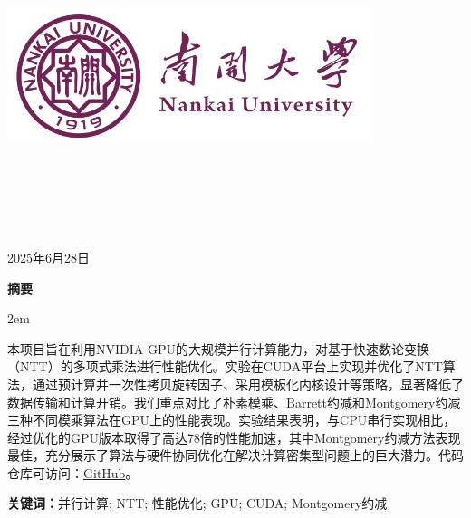 \documentclass[a4paper]{article}
\newcommand{\HRule}{\rule{\linewidth}{0.5mm}}%
\newenvironment{cnabstract}{
    \par\small
    \noindent\mbox{}\par\vspace{-\baselineskip}
    \par\songti\parindent 2em
    }
    {\par\vspace{1em}}
\begin{document}
\renewcommand{\contentsname}{目\ 录}
\renewcommand{\appendixname}{附录}
\renewcommand{\appendixpagename}{附录}
\renewcommand{\refname}{参考文献} 
\renewcommand{\figurename}{图}
\renewcommand{\tablename}{表}

\begin{titlepage}
    \begin{center}
    \includegraphics[width=0.8\textwidth]{fig/NKU.png}\\[1cm]
    \vspace{20mm}
		\textbf{\huge\textbf{}}\\[0.5cm]
		\textbf{\huge{}}\\[2.3cm]
		\textbf{\Huge\textbf{}}

		\vspace{\fill}
    
    \centering
    \textsc{\LARGE {}}\\[0.5cm]
    \textsc{\LARGE {}}\\[0.5cm]
    \textsc{\LARGE {}}\\[0.5cm]
    
    \vfill
    {\Large 2025年6月28日}
    \end{center}
\end{titlepage}

\clearpage
{}
\begin{center}{\songti\bfseries{摘\quad 要}}\end{center}\par\vspace{0.5em}
\begin{cnabstract}
本项目旨在利用NVIDIA GPU的大规模并行计算能力，对基于快速数论变换（NTT）的多项式乘法进行性能优化。实验在CUDA平台上实现并优化了NTT算法，通过预计算并一次性拷贝旋转因子、采用模板化内核设计等策略，显著降低了数据传输和计算开销。我们重点对比了朴素模乘、Barrett约减和Montgomery约减三种不同模乘算法在GPU上的性能表现。实验结果表明，与CPU串行实现相比，经过优化的GPU版本取得了高达78倍的性能加速，其中Montgomery约减方法表现最佳，充分展示了算法与硬件协同优化在解决计算密集型问题上的巨大潜力。代码仓库可访问：\href{https://github.com/aokimi0/parallel-programming}{GitHub}。

\vspace{1em}
\noindent\textbf{关键词：}并行计算; NTT; 性能优化; GPU; CUDA; Montgomery约减
\end{cnabstract}
\end{document}
